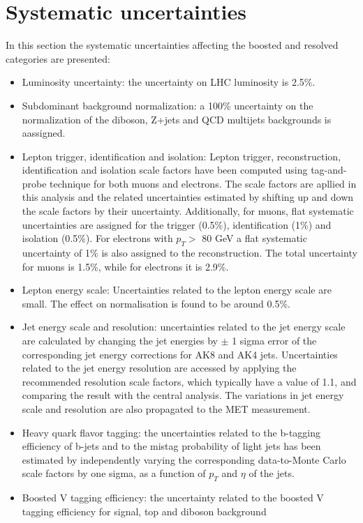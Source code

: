 \section{Systematic uncertainties}
In this section the systematic uncertainties affecting the boosted and resolved categories are
presented:
\begin{itemize}
\item  Luminosity uncertainty:  the uncertainty on LHC luminosity is 2.5\%.
\item Subdominant background normalization: a 100\% uncertainty on the normalization of the diboson, Z+jets and QCD multijets
backgrounds is aassigned.
\item Lepton trigger, identification and isolation: Lepton trigger, reconstruction, identification and isolation scale factors have been computed
using tag-and-probe technique for both muons  and electrons. 
The scale factors are apllied in this analysis and the related uncertainties estimated by shifting up and down
the scale factors by their uncertainty. Additionally, for muons, flat systematic uncertainties are
assigned for the trigger (0.5\%), identification (1\%) and isolation (0.5\%). 
For electrons with $p_T>$ 80 GeV a flat systematic uncertainty of 1\% is also assigned to the reconstruction. The total
uncertainty for muons is 1.5\%, while for electrons it is 2.9\%.
\item Lepton energy scale: Uncertainties related to the lepton energy scale are small. The effect on normalisation
is found to be around 0.5\%.
\item Jet energy scale and resolution: uncertainties related to the jet energy scale are calculated by changing the jet energies by $\pm$ 1
sigma error of the corresponding jet energy corrections for AK8 and AK4 jets.
Uncertainties related to the jet energy resolution are accessed by applying the recommended
resolution scale factors, which typically have a value of 1.1, and comparing the result with
the central analysis. The variations in jet energy scale and resolution are also propagated to the
MET measurement.
\item Heavy quark flavor tagging: the uncertainties related to the b-tagging efficiency of b-jets and to the mistag probability of
light jets has been estimated by independently varying the corresponding data-to-Monte Carlo
scale factors  by one sigma, as a function of $p_T$ and $\eta$ of the jets.
\item Boosted V tagging efficiency: the uncertainty related to the boosted V tagging efficiency for signal, top and diboson background 

\end{itemize}
